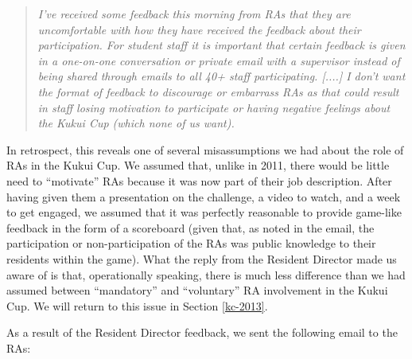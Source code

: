 \documentclass[]{IEEEconf}
\begin{document}
\begin{quotation}
{\em 
I've received some feedback this morning from RAs that they are
uncomfortable with how they have received the feedback about their participation. For
student staff it is important that certain feedback is given in a one-on-one conversation
or private email with a supervisor instead of being shared through emails to all 40+ staff
participating. [....] I don't want the format of
feedback to discourage or embarrass RAs as that could result in staff losing motivation to
participate or having negative feelings about the Kukui Cup (which none of us want). 
}
\end{quotation}

In retrospect, this reveals one of several misassumptions we had about the role of RAs in
the Kukui Cup.  We assumed that, unlike in 2011, there would be little need to ``motivate'' RAs
because it was now part of their job description.  After having given them a presentation
on the challenge, a video to watch, and a week to get engaged, we assumed that it was
perfectly reasonable to provide game-like feedback in the form of a scoreboard (given
that, as noted in the email, the participation or non-participation of the RAs was public
knowledge to their residents within the game).  What the reply from the Resident Director
made us aware of is that, operationally speaking, there is much less difference than we
had assumed between ``mandatory'' and ``voluntary'' RA involvement in the
Kukui Cup.  We will return to this issue in Section \ref{kc-2013}.

As a result of the Resident Director feedback, we sent the following email to the RAs:
\end{document}

